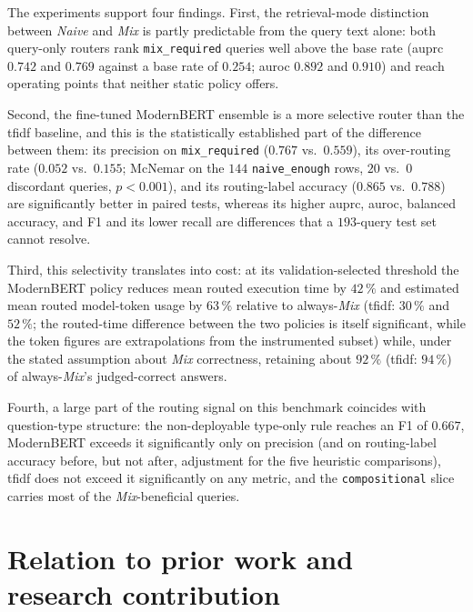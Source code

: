 \documentclass[english, bibtex]{kththesis}               %
\numberwithin{listing}{chapter}
\begin{document}
The experiments support four findings. First, the retrieval-mode distinction between \emph{Naive} and \emph{Mix} is partly predictable from the query text alone: both query-only routers rank \texttt{mix\_required} queries well above the base rate (\gls{auprc} $0.742$ and $0.769$ against a base rate of $0.254$; \gls{auroc} $0.892$ and $0.910$) and reach operating points that neither static policy offers.

Second, the fine-tuned ModernBERT ensemble is a more selective router than the \gls{tfidf} baseline, and this is the statistically established part of the difference between them: its precision on \texttt{mix\_required} ($0.767$ vs.\ $0.559$), its over-routing rate ($0.052$ vs.\ $0.155$; McNemar on the $144$ \texttt{naive\_enough} rows, $20$ vs.\ $0$ discordant queries, $p < 0.001$), and its routing-label accuracy ($0.865$ vs.\ $0.788$) are significantly better in paired tests, whereas its higher \gls{auprc}, \gls{auroc}, balanced accuracy, and F1 and its lower recall are differences that a $193$-query test set cannot resolve.

Third, this selectivity translates into cost: at its validation-selected threshold the ModernBERT policy reduces mean routed execution time by $42\,\%$ and estimated mean routed model-token usage by $63\,\%$ relative to always-\emph{Mix} (\gls{tfidf}: $30\,\%$ and $52\,\%$; the routed-time difference between the two policies is itself significant, while the token figures are extrapolations from the instrumented subset) while, under the stated assumption about \emph{Mix} correctness, retaining about $92\,\%$ (\gls{tfidf}: $94\,\%$) of always-\emph{Mix}'s judged-correct answers.

Fourth, a large part of the routing signal on this benchmark coincides with question-type structure: the non-deployable type-only rule reaches an F1 of $0.667$, ModernBERT exceeds it significantly only on precision (and on routing-label accuracy before, but not after, adjustment for the five heuristic comparisons), \gls{tfidf} does not exceed it significantly on any metric, and the \texttt{compositional} slice carries most of the \emph{Mix}-beneficial queries.

\section{Relation to prior work and research contribution}
\label{sec:discPriorWork}
\end{document}
